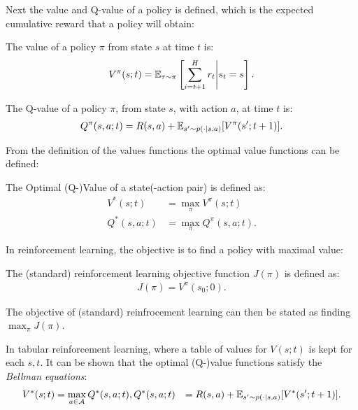     Next the value and Q-value of a policy is defined, which is the expected cumulative reward that a policy will obtain:
    \begin{defn}
        \label{def:value}
        \label{def:q_value}
        The \textnormal{value} of a policy $\pi$ from state $s$ at time $t$ is:
        \begin{align}
            V^{\pi}(s;t) = \mathbb{E}_{\tau\sim\pi}\left[\sum_{i=t+1}^H r_t \Bigg| s_t=s \right].
        \end{align} 

        The \textnormal{Q-value} of a policy $\pi$, from state $s$, with action $a$, at time $t$ is:
        \begin{align}
            Q^{\pi}(s,a;t) = R(s,a) + \mathbb{E}_{s'\sim p(\cdot|s,a)} [V^{\pi}(s';t+1)].
        \end{align} 
    \end{defn}

    From the definition of the values functions the optimal value functions can be defined:
    \begin{defn}
        \label{def:optimal_value}
        \label{def:optimal_q_value}
        The \textnormal{Optimal (Q-)Value} of a state(-action pair) is defined as:
        \begin{align}
            V^*(s;t) &= \max_{\pi} V^{\pi}(s;t) \\
            Q^*(s,a;t) &= \max_{\pi} Q^{\pi}(s,a;t).
        \end{align}
    \end{defn}

    In reinforcement learning, the objective is to find a policy with maximal value:
    \begin{defn}
        The \textnormal{(standard) reinforcement learning objective function} $J(\pi)$ is defined as:
        \begin{align}
            J(\pi) = V^{\pi}(s_0;0).
        \end{align}

        The objective of (standard) reinfrocement learning can then be stated as finding $\max_{\pi} J(\pi)$.
    \end{defn}

    In tabular reinforcement learning, where a table of values for $V(s;t)$  is kept for each $s,t$. It can be shown  that the optimal (Q-)value functions satisfy the \textit{Bellman equations}:
    \begin{align}
        V^*(s;t) &= \max_{a\in\mathcal{A}} Q^*(s,a;t),
        Q^*(s,a;t) &= R(s,a) + \mathbb{E}_{s'\sim p(\cdot|s,a)} [V^*(s';t+1)].
    \end{align} 

